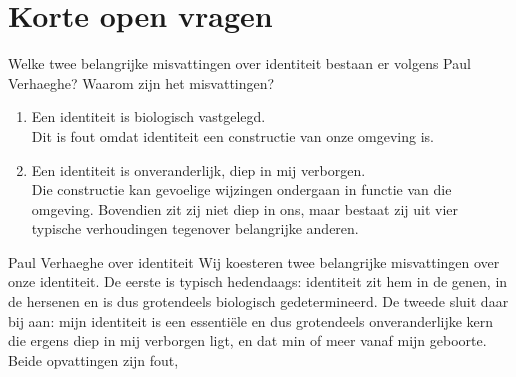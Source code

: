 \documentclass[main.tex]{subfiles}
\begin{document}
\section{Korte open vragen}

\begin{examenvraag}
    \begin{vraag}
        Welke twee belangrijke misvattingen over identiteit bestaan er volgens Paul Verhaeghe? Waarom zijn het misvattingen?
    \end{vraag}

    \begin{antwoord}
        \begin{enumerate}
            \item Een identiteit is biologisch vastgelegd.\\
            Dit is fout omdat identiteit een constructie van onze omgeving is. 
            \item Een identiteit is onveranderlijk, diep in mij verborgen.\\
            Die constructie kan gevoelige wijzingen ondergaan in functie van die omgeving.  Bovendien zit zij niet diep in ons, maar bestaat zij uit vier
typische verhoudingen tegenover belangrijke anderen. 
        \end{enumerate}
        \begin{citaat}{Paul Verhaeghe over identiteit}
            Wij koesteren twee belangrijke misvattingen over onze identiteit.
            De eerste is typisch hedendaags: identiteit zit hem in de genen, in de hersenen en is dus grotendeels biologisch gedetermineerd.
            De tweede sluit daar bij aan: mijn identiteit is een essentiële en dus grotendeels onveranderlijke kern die ergens diep in mij verborgen ligt, en dat min of meer vanaf mijn geboorte.
            Beide opvattingen zijn fout,
        \end{citaat}
    \end{antwoord}
\end{examenvraag}
\end{document}
